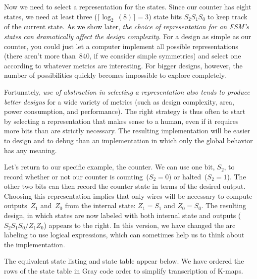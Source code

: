 Now we need to select a representation for the states.  Since our counter
has eight states, we need at least three ($\lceil\log_2~(8)\rceil=3$)
state bits $S_2S_1S_0$ to keep track of the current state.
%
As we show later, {\em the choice of representation for an FSM's states
can dramatically affect the design complexity}.  For a design as simple as 
our counter, you could just let a computer implement all possible 
representations (there aren't more than~840, if we consider simple 
symmetries) and select one according to whatever metrics are interesting.
%
For bigger designs, however, the number of possibilities quickly becomes
impossible to explore completely.

Fortunately, {\em use of abstraction in selecting a representation 
also tends to produce better designs} for a wide variety of metrics
(such as design complexity, area, power consumption, and performance).
%
The right strategy is thus often to start by selecting a representation 
that makes sense to a human, even if it requires more bits than are
strictly necessary.  The
resulting implementation will be easier to
design and to debug than an implementation in which only the global 
behavior has any meaning.

\begin{minipage}{3.25in}
Let's return to our specific example, the counter.  We can use one bit, 
$S_2$, to record whether or not our counter is counting~($S_2=0$) or
halted~($S_2=1$).  The other two bits can then record the counter state
in terms of the desired output.  Choosing this representation
implies that only wires will be necessary to compute outputs~$Z_1$ 
and~$Z_0$ from the internal state: $Z_1=S_1$ and $Z_0=S_0$.  The resulting
design, in which states are now labeled with both internal state and
outputs ($S_2S_1S_0/Z_1Z_0$) appears to the right.  In this version,
we have changed the arc labeling to use logical expressions, which
can sometimes help us to think about the implementation.
\end{minipage}\hspace{.25in}%
\begin{minipage}{3in}
\end{minipage}

The equivalent state listing and state table appear below.  We have ordered
the rows of the state table in Gray code order to simplify transcription
of K-maps.

